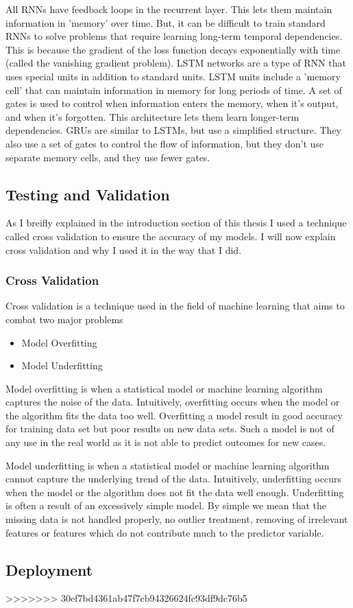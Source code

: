 All RNNs have feedback loops in the recurrent layer. This lets them maintain information in 'memory' over time. But, it can be difficult to train standard RNNs to solve problems that require learning long-term temporal dependencies. This is because the gradient of the loss function decays exponentially with time (called the vanishing gradient problem). LSTM networks are a type of RNN that uses special units in addition to standard units. LSTM units include a 'memory cell' that can maintain information in memory for long periods of time. A set of gates is used to control when information enters the memory, when it's output, and when it's forgotten. This architecture lets them learn longer-term dependencies. GRUs are similar to LSTMs, but use a simplified structure. They also use a set of gates to control the flow of information, but they don't use separate memory cells, and they use fewer gates.



\subsection{Testing and Validation}
As I breifly explained in the introduction section of this thesis I used a technique called cross validation to ensure the accuracy of my models. I will now explain cross validation and why I used it in the way that I did.

\subsubsection{Cross Validation}
Cross validation is a technique used in the field of machine learning that aims to combat two major problems

\begin{itemize}
	\item Model Overfitting
	\item Model Underfitting
\end{itemize}
Model overfitting is when a statistical model or machine learning algorithm captures the noise of the data. Intuitively, overfitting occurs when the model or the algorithm fits the data too well.
Overfitting a model result in good accuracy for training data set but poor results on new data sets. Such a model is not of any use in the real world as it is not able to predict outcomes for new cases.

Model underfitting is when a statistical model or machine learning algorithm cannot capture the underlying trend of the data. Intuitively, underfitting occurs when the model or the algorithm does not fit the data well enough. Underfitting is often a result of an excessively simple model. By simple we mean that the missing data is not handled properly, no outlier treatment, removing of irrelevant features or features which do not contribute much to the predictor variable.

\subsection{Deployment}








>>>>>>> 30ef7bd4361ab47f7cb94326624fc93df9dc76b5
